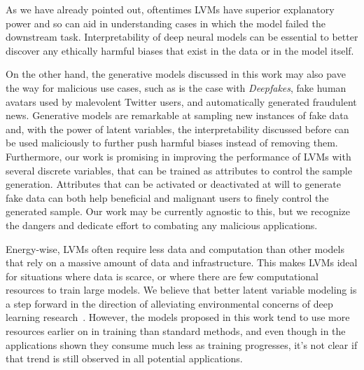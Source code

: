 As we have already pointed out, oftentimes LVMs
have superior explanatory power and so can aid in understanding cases
in which the model failed the downstream task. Interpretability of
deep neural models can be essential to better discover any ethically
harmful biases that exist in the data or in the model itself.

On the other hand, the generative models discussed in this work may
also pave the way for malicious use cases, such as is the case with
\emph{Deepfakes}, fake human avatars used by malevolent Twitter
users, and automatically generated fraudulent news. Generative models
are remarkable at sampling new instances of fake data and, with the
power of latent variables, the interpretability discussed before can
be used maliciously to further push harmful biases instead of
removing them. Furthermore, our work is promising in improving the
performance of LVMs with several discrete
variables, that can be trained as attributes to control the sample
generation. Attributes that can be activated or deactivated at will
to generate fake data can both help beneficial and malignant users to
finely control the generated sample. Our work may be currently
agnostic to this, but we recognize the dangers and dedicate effort to
combating any malicious applications.

Energy-wise, LVMs often require less data and
computation than other models that rely on a massive amount of data
and infrastructure. This makes LVMs ideal for
situations where data is scarce, or where there are few computational
resources to train large models. We believe that better latent
variable modeling is a step forward in the direction of alleviating
environmental concerns of deep learning
research~\citep{strubell2019energy}. However, the models proposed in
this work tend to use more resources earlier on in training than
standard methods, and even though in the applications shown they
consume much less as training progresses, it's not clear if that
trend is still observed in all potential applications.


